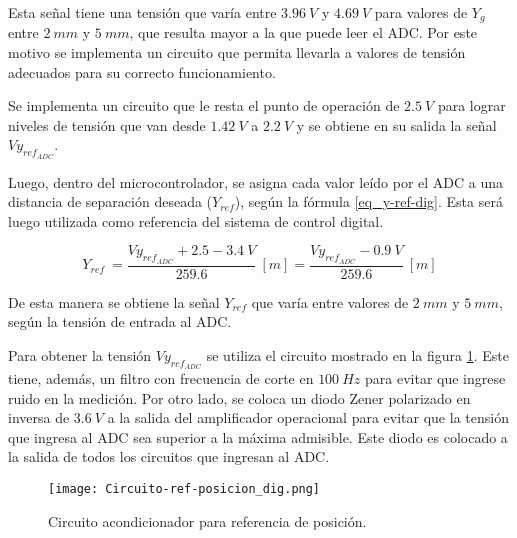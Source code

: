 Esta señal tiene una tensión que varía entre $3.96\:V$ y $4.69\:V$ para valores de $Y_g$ entre $2\:mm$ y $5\:mm$, que resulta mayor a la que puede leer el ADC. Por este motivo se implementa un circuito que permita llevarla a valores de tensión adecuados para su correcto funcionamiento. 

Se implementa un circuito que le resta el punto de operación de $2.5\:V$  para lograr niveles de tensión que van desde $1.42\:V$ a $2.2\:V$ y se obtiene en su salida la señal $Vy_{ref_{ADC}}$.

Luego, dentro del microcontrolador, se asigna cada valor leído por el ADC a una distancia de separación deseada ($Y_{ref}$), según la fórmula \ref{eq_y-ref-dig}. Esta será luego utilizada como referencia del sistema de control digital.

\begin{equation} \label{eq_y-ref-dig}
	Y_{ref}\ =\frac{Vy_{ref_{ADC}} +2.5 - 3.4\:V}{259.6}\:[m]=\frac{Vy_{ref_{ADC}} - 0.9\:V}{259.6}\:[m]
\end{equation}

De esta manera se obtiene la señal $Y_{ref}$ que varía entre valores de $2\:mm$ y $5\:mm$, según la tensión de entrada al ADC.

Para obtener la tensión $Vy_{ref_{ADC}}$ se utiliza el circuito mostrado en la figura \ref{fig:circuito-ref-posicion}. Este tiene, además, un filtro con frecuencia de corte en $100\:Hz$ para evitar que ingrese ruido en la medición. Por otro lado, se coloca un diodo Zener polarizado en inversa de $3.6\:V$ a la salida del amplificador operacional para evitar que la tensión que ingresa al ADC sea superior a la máxima admisible. Este diodo es colocado a la salida de todos los circuitos que ingresan al ADC.


\begin{figure}[H]
	\centering
	\texttt{[image: Circuito-ref-posicion\_dig.png]}
	\caption{Circuito acondicionador para referencia de posición.}
	\label{fig:circuito-ref-posicion}
\end{figure}

%
%  
%  
 
